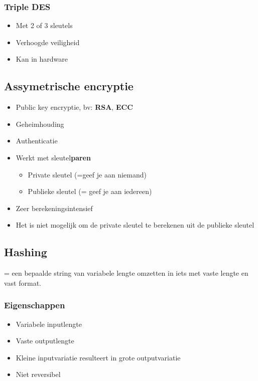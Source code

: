 \documentclass{article}
\newcommand{\bold}[1]{\textbf{#1}}
\begin{document}
\subsubsection{Triple DES}

\begin{itemize}
    \item Met 2 of 3 sleutels
    \item Verhoogde veiligheid
    \item Kan in hardware
\end{itemize}

\subsection{Assymetrische encryptie}

\begin{itemize}
    \item Public key encryptie, bv: \bold{RSA}, \bold{ECC}
    \item Geheimhouding
    \item Authenticatie
    \item Werkt met sleutel\bold{paren}
    \begin{itemize}
        \item Private sleutel (=geef je aan niemand)
        \item Publieke sleutel (= geef je aan iedereen)
    \end{itemize}
    \item Zeer berekeningsintensief
    \item Het is niet mogelijk om de private sleutel te berekenen uit de publieke sleutel
\end{itemize}

\subsection{Hashing}

= een bepaalde string van variabele lengte omzetten in iets met vaste lengte en vast format. 

\subsubsection{Eigenschappen}

\begin{itemize}
    \item Variabele inputlengte
    \item Vaste outputlengte
    \item Kleine inputvariatie resulteert in grote outputvariatie
    \item Niet reversibel
\end{itemize}
\end{document}
